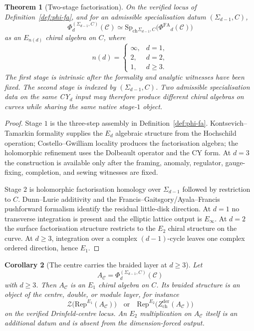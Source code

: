 \documentclass[11pt]{article}
\newtheorem{theorem}{Theorem}[section]
\newtheorem{corollary}[theorem]{Corollary}
\providecommand{\Rep}{\mathrm{Rep}}
\providecommand{\cC}{\mathcal{C}}
\providecommand{\cZ}{\mathcal{Z}}
\providecommand{\PhiFA}{\Phi^{\mathrm{FA}}{}}
\providecommand{\SpCh}{\mathrm{Sp}_{\mathrm{ch}}{}}
\providecommand{\Zchder}{Z^{\mathrm{der}}_{\mathrm{ch}}}
\begin{document}
\begin{theorem}[Two-stage factorisation]
\label{thm:two-stage}
On the verified locus of Definition~\ref{def:phi-fa}, and for an
admissible specialisation datum $(\Sigma_{d-1},C)$,
\[
 \Phi_d^{(\Sigma_{d-1},C)}(\cC)
 \simeq
 \SpCh_{\Sigma_{d-1},C}\bigl(\PhiFA_d(\cC)\bigr)
\]
as an $E_{n(d)}$ chiral algebra on $C$, where
\[
 n(d)=
 \begin{cases}
 \infty, & d=1,\\
 2, & d=2,\\
 1, & d\geq 3.
 \end{cases}
\]
The first stage is intrinsic after the formality and analytic witnesses
have been fixed.  The second stage is indexed by $(\Sigma_{d-1},C)$.
Two admissible specialisation data on the same CY$_d$ input may therefore
produce different chiral algebras on curves while sharing the same
native stage-$1$ object.
\end{theorem}

\begin{proof}
Stage $1$ is the three-step assembly in Definition~\ref{def:phi-fa}.
Kontsevich--Tamarkin formality supplies the $E_d$ algebraic structure
from the Hochschild operation; Costello--Gwilliam locality produces the
factorisation algebra; the holomorphic refinement uses the Dolbeault
operator and the CY form.  At $d=3$ the construction is available only
after the framing, anomaly, regulator, gauge-fixing, completion, and
sewing witnesses are fixed.

Stage $2$ is holomorphic factorisation homology over
$\Sigma_{d-1}$ followed by restriction to $C$.  Dunn--Lurie additivity
and the Francis--Gaitsgory/Ayala--Francis pushforward formalism identify
the residual little-disk direction.  At $d=1$ no transverse integration
is present and the elliptic lattice output is $E_\infty$.  At $d=2$ the
surface factorisation structure restricts to the $E_2$ chiral structure
on the curve.  At $d\geq 3$, integration over a complex $(d-1)$-cycle
leaves one complex ordered direction, hence $E_1$.
\end{proof}

\begin{corollary}[The centre carries the braided layer at $d\geq 3$]
\label{cor:e2-centre}
Let
\[
 A_\cC=\Phi_d^{(\Sigma_{d-1},C)}(\cC)
\]
with $d\geq 3$.  Then $A_\cC$ is an $E_1$ chiral algebra on $C$.  Its
braided structure is an object of the centre, double, or module layer,
for instance
\[
 \cZ\bigl(\Rep^{E_1}(A_\cC)\bigr)
 \quad\text{or}\quad
 \Rep^{E_2}\bigl(\Zchder(A_\cC)\bigr)
\]
on the verified Drinfeld-centre locus.  An $E_2$ multiplication on
$A_\cC$ itself is an additional datum and is absent from the
dimension-forced output.
\end{corollary}
\end{document}
